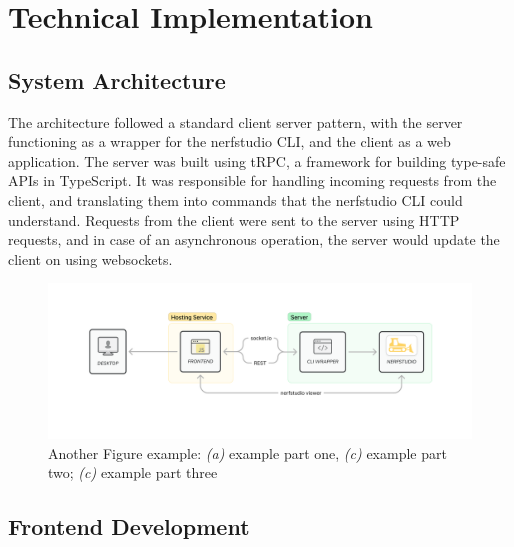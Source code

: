 %
\chapter{Technical Implementation}
\label{sec:system}



\section{System Architecture}
\label{sec:system:architecture}


The architecture followed a standard client server pattern, with the server functioning as a wrapper for the nerfstudio CLI, and the client as a web application.
The server was built using tRPC, a framework for building type-safe APIs in TypeScript.
It was responsible for handling incoming requests from the client, and translating them into commands that the nerfstudio CLI could understand.
Requests from the client were sent to the server using HTTP requests, and in case of an asynchronous operation, the server would update the client on using websockets.

\begin{figure}[htb]
	\includegraphics[width=\textwidth]{figures/architecture-1.png}
	\caption{Another Figure example: \textit{(a)} example part one, \textit{(c)} example part two; \textit{(c)} example part three}
	\label{fig:system:example2}
\end{figure}

\section{Frontend Development} 
\label{sec:system:frontend}



